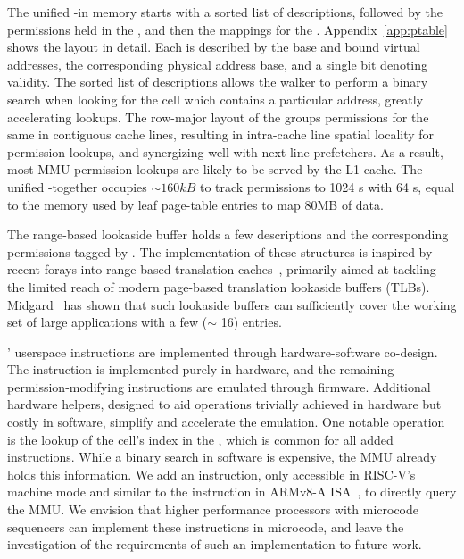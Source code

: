 The unified \ptable-\gtable in memory starts with a sorted
list of \cell descriptions, followed by the permissions held in the 
\ptable, and then the mappings for the \gtable.
Appendix~\ref{app:ptable} shows the layout in detail.
Each \cell is described by the base and bound virtual addresses, 
the corresponding physical address base, and a single bit denoting
validity.
The sorted list of \cell{} descriptions allows the \ptable walker to
perform a binary search when looking for the cell which contains a particular
address, greatly accelerating lookups.
The row-major layout of the \ptable groups permissions for the same \secdiv
in contiguous cache lines, resulting in intra-cache line spatial locality for
permission lookups, and synergizing well with next-line prefetchers.
As a result, most MMU permission lookups are likely to be served by the L1 cache.
The unified \ptable-\gtable together occupies $\sim160kB$ to track permissions
to 1024 \cell{}s with 64 \secdiv{}s, equal to the memory used by leaf 
page-table entries to map $80$MB of data.

The range-based lookaside buffer holds a few \cell{} descriptions
and the corresponding permissions tagged by \sid.
The implementation of these structures is inspired by recent forays into 
range-based translation caches~\cite{0003BOBFP21midgard, YanLNB19, BasuGCHS13}, 
primarily aimed at tackling the limited reach of modern page-based translation 
lookaside buffers (TLBs).
Midgard~\cite{0003BOBFP21midgard} has shown that such lookaside buffers can 
sufficiently cover the working set of large applications with a 
few ($\sim$ 16) entries.

\seccells' userspace instructions are implemented through 
hardware-software co-design.
The \sdswitch instruction is implemented purely in hardware, and the
remaining permission-modifying instructions are emulated through firmware.
Additional hardware helpers, designed to aid operations trivially achieved
in hardware but costly in software, simplify and accelerate the emulation.
One notable operation is the lookup of the cell's index in the 
\ptable, which is common for all added instructions.
While a binary search in software is expensive, the MMU already holds this
information. 
We add an instruction, only accessible in RISC-V's machine mode and similar 
to the  instruction in ARMv8-A ISA~\cite{ARMAT}, to directly query the MMU.
We envision that higher performance processors with microcode sequencers
can implement these instructions in microcode, and
leave the investigation of the requirements of such an implementation
to future work.

